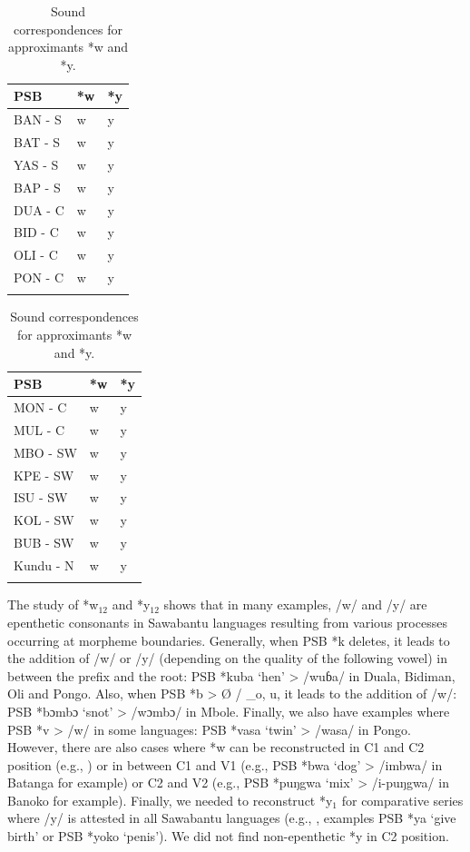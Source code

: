 \documentclass[output=paper,colorlinks,citecolor=brown
]{langscibook}
\begin{document}
\begin{table}
\caption{Sound correspondences for approximants *w and *y.}
\label{tab:grollemundbrownrule:approximants}
 \begin{tabular}{lll}
  \lsptoprule
\textbf{PSB} & \textbf{*w} & \textbf{*y} \\
\midrule
BAN - S      & w           & y           \\
BAT - S      & w           & y           \\
YAS - S      & w           & y           \\
BAP - S      & w           & y           \\
DUA - C      & w           & y           \\
BID - C      & w           & y           \\
OLI - C      & w           & y           \\
PON - C      & w           & y           \\
   \lspbottomrule
 \end{tabular}
 \qquad
 \begin{tabular}{lll}
  \lsptoprule
\textbf{PSB} & \textbf{*w} & \textbf{*y} \\
\midrule
MON - C      & w           & y           \\
MUL - C      & w           & y           \\
MBO - SW     & w           & y           \\
KPE - SW     & w           & y           \\
ISU - SW     & w           & y           \\
KOL - SW     & w           & y           \\
BUB - SW     & w           & y           \\
Kundu - N    & w           & y           \\
   \lspbottomrule
 \end{tabular}
\end{table}

The study of *w$_{12}$ and *y$_{12}$ shows that in many examples, /w/ and /y/ are epenthetic consonants in Sawabantu languages resulting from various processes occurring at morpheme boundaries. Generally, when PSB *k deletes, it leads to the addition of /w/ or /y/ (depending on the quality of the following vowel) in between the prefix and the root: PSB *kuba `hen' > /wuɓa/ in Duala, Bidiman, Oli and Pongo. Also, when PSB *b > Ø / \_o, u, it leads to the addition of /w/: PSB *bɔmbɔ `snot' > /wɔmbɔ/ in Mbole. Finally, we also have examples where PSB *v > /w/ in some languages: PSB *vasa `twin' > /wasa/ in Pongo. However, there are also cases where *w can be reconstructed in C1 and C2 position (e.g., ) or in between C1 and V1 (e.g., PSB *bwa `dog' > /imbwa/ in Batanga for example) or C2 and V2 (e.g., PSB *puŋgwa `mix' > /i-puŋgwa/ in Banoko for example). Finally, we needed to reconstruct *y$_1$ for comparative series where /y/ is attested in all Sawabantu languages (e.g., , examples PSB *ya `give birth' or PSB *yoko `penis'). We did not find non-epenthetic *y in C2 position. 
\end{document}
